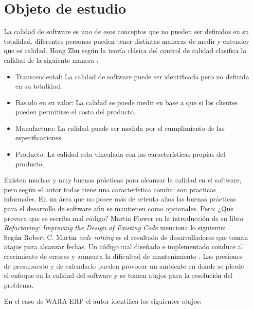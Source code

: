 \section*{Objeto de estudio}
\noindent
La calidad de software es uno de esos conceptos que no pueden ser definidos en su totalidad, diferentes personas pueden tener distintas maneras de medir y entender que es calidad. Hong Zhu según la teoría clásica del control de calidad clasifica la calidad de la siguiente manera \citet{sdm_05}:

\begin{itemize}
    \item Transcendental: La calidad de software puede ser identificada pero no definida en su totalidad.
    \item Basado en su valor: La calidad se puede medir en base a que si los clientes pueden permitirse el costo del producto.
    \item Manufactura: La calidad puede ser medida por el cumplimiento de las especificaciones. 
    \item Producto: La calidad esta vinculada con las características propias del producto.
\end{itemize}

\vspace{5mm}
\noindent
    Existen muchas y muy buenas prácticas para alcanzar la calidad en el software, pero según el autor todas tiene una característica común: son practicas informales. En un área que no posee más de setenta años las buenas prácticas para el desarrollo de software aún se mantienen como opcionales. Pero: ¿Que provoca que se escriba mal código? Martin Flower en la introducción de su libro \textit{Refactoring: Improving the Design of Existing Code} menciona lo siguiente:   \citet{RIDEC_99}. Según Robert C. Martin \textit{code rotting} es el resultado de desarrolladores que toman atajos para alcanzar fechas. Un código mal diseñado e implementado conduce al crecimiento de errores y aumenta la dificultad de mantenimiento \citet{cc_09}. Las presiones de presupuesto y de calendario pueden provocar un ambiente en donde se pierde el enfoque en la calidad del software y se tomen atajos para la resolución del problema. 

\vspace{5mm}
\noindent
En el caso de WARA ERP  el autor  identifica los siguientes atajos:

